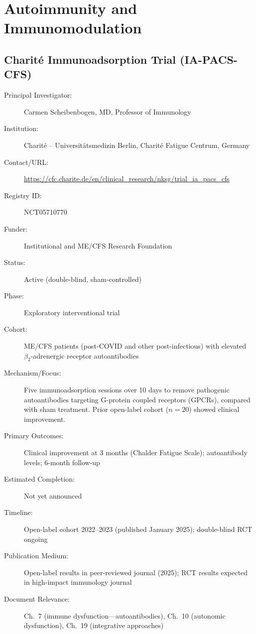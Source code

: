\section{Autoimmunity and Immunomodulation}
\label{sec:registry-autoimmunity}

\subsection{Charit\'{e} Immunoadsorption Trial (IA-PACS-CFS)}
\label{sec:registry-charite-ia}

\begin{description}
    \item[Principal Investigator:] Carmen Scheibenbogen, MD, Professor of
        Immunology
    \item[Institution:] Charit\'{e} -- Universit\"{a}tsmedizin Berlin,
        Charit\'{e} Fatigue Centrum, Germany
    \item[Contact/URL:] \url{https://cfc.charite.de/en/clinical_research/nksg/trial_ia_pacs_cfs}
    \item[Registry ID:] NCT05710770
    \item[Funder:] Institutional and ME/CFS Research Foundation
    \item[Status:] Active (double-blind, sham-controlled)
    \item[Phase:] Exploratory interventional trial
    \item[Cohort:] ME/CFS patients (post-COVID and other post-infectious)
        with elevated $\beta_2$-adrenergic receptor autoantibodies
    \item[Mechanism/Focus:] Five immunoadsorption sessions over 10 days
        to remove pathogenic autoantibodies targeting G-protein coupled
        receptors (GPCRs), compared with sham treatment.
        Prior open-label cohort ($n=20$) showed clinical improvement.
    \item[Primary Outcomes:] Clinical improvement at 3 months (Chalder
        Fatigue Scale); autoantibody levels; 6-month follow-up
    \item[Estimated Completion:] Not yet announced
    \item[Timeline:] Open-label cohort 2022--2023 (published January 2025);
        double-blind RCT ongoing
    \item[Publication Medium:] Open-label results in peer-reviewed journal
        (2025); RCT results expected in high-impact immunology journal
    \item[Document Relevance:] Ch.~7 (immune dysfunction---autoantibodies),
        Ch.~10 (autonomic dysfunction), Ch.~19 (integrative approaches)
\end{description}

